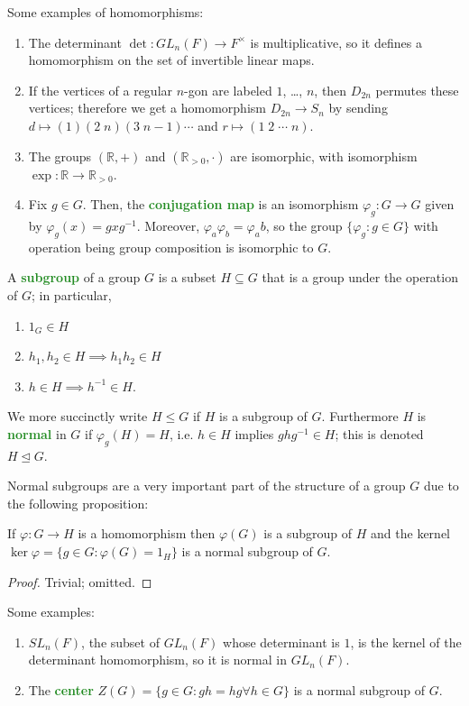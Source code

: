 \documentclass[11pt]{scrartcl}
\providecommand{\RR}{\mathbb R}
\providecommand{\ii}{\item}
\providecommand{\inv}{^{-1}}
\providecommand{\vocab}[1]{{\textbf{\textcolor{ForestGreen}{#1}}}}
\begin{document}
\begin{example}
    Some examples of homomorphisms:
    \begin{enumerate}[(1)]
	\ii The determinant $\det\colon GL_n(F)\to F^\times$
	is multiplicative, so it defines a homomorphism
	on the set of invertible linear maps.
	\ii If the vertices of a regular $n$-gon are labeled
	$1$, \dots, $n$, then $D_{2n}$ permutes these vertices;
	therefore we get a homomorphism $D_{2n}\to S_n$
	by sending $d\mapsto (1)(2\; n)(3\; n-1)\cdots$
	and $r\mapsto (1\; 2\; \cdots \; n)$.
	\ii The groups $(\RR,+)$ and $(\RR_{>0}, \cdot)$
	are isomorphic, with isomorphism $\exp\colon\RR\to\RR_{>0}$.
	\ii Fix $g\in G$. Then, the \vocab{conjugation map} is an isomorphism
	$\varphi_g\colon G\to G$ given by $\varphi_g(x) = gxg\inv$.
	Moreover, $\varphi_a\varphi_b = \varphi_ab$,
	so the group $\{\varphi_g : g\in G\}$ with operation being group composition
	is isomorphic to $G$.
    \end{enumerate}
\end{example}

\begin{definition}[Subgroup]
    \label{def:subgroup}
    A \vocab{subgroup} of a group $G$ is a subset $H\subseteq G$
    that is a group under the operation of $G$; in particular,
    \begin{enumerate}[(1)]
        \ii $1_G\in H$
	\ii $h_1,h_2\in H\implies h_1h_2\in H$
	\ii $h\in H\implies h\inv\in H$.
    \end{enumerate}
    We more succinctly write $H\le G$ if $H$ is a subgroup of $G$.
    Furthermore $H$ is \vocab{normal} in $G$
    if $\varphi_g(H) = H$, i.e. $h\in H$ implies $ghg\inv\in H$;
    this is denoted $H\trianglelefteq G$.
\end{definition}

Normal subgroups are a very important part
of the structure of a group $G$ due to the following proposition:

\begin{prop}
    \label{prop:kernel-is-normal}
    If $\varphi\colon G\to H$ is a homomorphism
    then $\varphi(G)$ is a subgroup of $H$
    and the kernel $\ker\varphi = \{g\in G : \varphi(G) = 1_H\}$
    is a normal subgroup of $G$.
\end{prop}

\begin{proof}
    Trivial; omitted.
\end{proof}

\begin{example}
    Some examples:
    \begin{enumerate}[(1)]
        \ii $SL_n(F)$, the subset of $GL_n(F)$
	whose determinant is $1$,
	is the kernel of the determinant homomorphism,
	so it is normal in $GL_n(F)$.
	\ii The \vocab{center} $Z(G) = \{g\in G : gh = hg\forall h\in G\}$
	is a normal subgroup of $G$.
    \end{enumerate}
\end{example}
\end{document}
